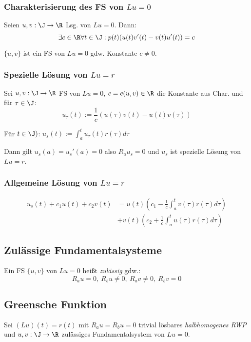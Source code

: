 \subsubsection*{Charakterisierung des FS von \(Lu=0\)}

Seien \(u,v : \J \to \R\) Lsg. von \(Lu=0\). Dann: \[\exists c \in \R \forall t \in \J : p(t)(u(t)v'(t)-v(t)u'(t)) = c\]

\(\{u,v\}\) ist ein FS von \(Lu=0\) gdw. Konstante \(c \neq 0\).

\subsubsection*{Spezielle Lösung von \(Lu=r\)}

Sei \(u,v : \J \to \R\) FS von \(Lu=0\), \(c = c(u,v) \in \R\) die Konstante aus Char. und für \(\tau \in \J\): \[u_\tau(t) := \frac{1}{c} (u(\tau)v(t)-u(t)v(\tau))\]

Für \(t \in \J)\): \(u_s(t) := \displaystyle\int_a^t u_\tau(t) r(\tau) d\tau\)

Dann gilt \(u_s(a) = u_s'(a) = 0\) also \(R_a u_s = 0\) und \(u_s\) ist spezielle Lösung von \(Lu=r\).

\subsubsection*{Allgemeine Lösung von \(Lu=r\)}

\vspace*{-4mm}
\begin{align*}
u_s(t)+c_1 u(t) + c_2 v(t) &= u(t)\left(c_1-\frac{1}{c}\int_a^t v(\tau) r(\tau) d\tau \right) \\
&+ v(t)\left(c_2+\frac{1}{c}\int_a^t u(\tau)r(\tau) d\tau \right)
\end{align*}

\subsection*{Zulässige Fundamentalsysteme}

Ein FS \(\{u,v\}\) von \(Lu=0\) heißt \emph{zulässig} gdw.: \[R_a u = 0, \ R_b u \neq 0, \ R_a v \neq 0, \ R_b v = 0\]

\subsection*{Greensche Funktion}

Sei \((Lu)(t)=r(t)\) mit \(R_a u = R_b u = 0\) trivial lösbares \emph{halbhomogenes RWP} und \(u, v : \J \to \R\) zulässiges Fundamentalsystem von \(Lu=0\).

